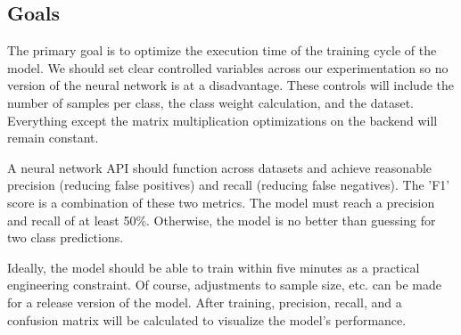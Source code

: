 \documentclass[journal]{IEEEtran}
\begin{document}
\subsection{Goals}
\par The primary goal is to optimize the execution time of the training cycle of the model. We should set clear controlled variables across our experimentation so no version of the neural network is at a disadvantage. These controls will include the number of samples per class, the class weight calculation, and the dataset. Everything except the matrix multiplication optimizations on the backend will remain constant. 
\par A neural network API should function across datasets and achieve reasonable precision (reducing false positives) and recall (reducing false negatives). The 'F1' score is a combination of these two metrics. The model must reach a precision and recall of at least 50\%. Otherwise, the model is no better than guessing for two class predictions. 
\par Ideally, the model should be able to train within five minutes as a practical engineering constraint. Of course, adjustments to sample size, etc. can be made for a release version of the model. After training, precision, recall, and a confusion matrix will be calculated to visualize the model's performance. 
\end{document}
